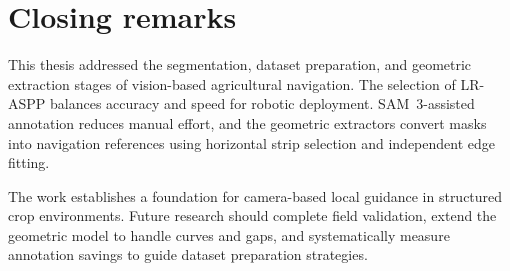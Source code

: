 \section{Closing remarks}
\label{sec:closing}

This thesis addressed the segmentation, dataset preparation, and geometric extraction stages of vision-based agricultural navigation. The selection of LR-ASPP balances accuracy and speed for robotic deployment. SAM~3-assisted annotation reduces manual effort, and the geometric extractors convert masks into navigation references using horizontal strip selection and independent edge fitting.

The work establishes a foundation for camera-based local guidance in structured crop environments. Future research should complete field validation, extend the geometric model to handle curves and gaps, and systematically measure annotation savings to guide dataset preparation strategies.
